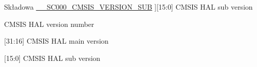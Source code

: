 \begin{DoxyRefList}
%
Składowa \hyperlink{core__sc000_8h_af4db9bbe5ff5726d8a8c388e52d5685d}{\+\_\+\+\_\+\+S\+C000\+\_\+\+C\+M\+S\+I\+S\+\_\+\+V\+E\+R\+S\+I\+O\+N\+\_\+\+S\+UB} ]\mbox{[}15\+:0\mbox{]} C\+M\+S\+IS H\+AL sub version  
\item[\label{deprecated__deprecated000036}%
\Hypertarget{deprecated__deprecated000036}%
Składowa \hyperlink{core__sc300_8h_a2f960c3c99ab33e1cf4b5287821c44dd}{\+\_\+\+\_\+\+S\+C300\+\_\+\+C\+M\+S\+I\+S\+\_\+\+V\+E\+R\+S\+I\+ON} ]C\+M\+S\+IS H\+AL version number  
\item[\label{deprecated__deprecated000034}%
\Hypertarget{deprecated__deprecated000034}%
Składowa \hyperlink{core__sc300_8h_a0e2124db4f74f2b355904314accf1790}{\+\_\+\+\_\+\+S\+C300\+\_\+\+C\+M\+S\+I\+S\+\_\+\+V\+E\+R\+S\+I\+O\+N\+\_\+\+M\+A\+IN} ]\mbox{[}31\+:16\mbox{]} C\+M\+S\+IS H\+AL main version  
\item[\label{deprecated__deprecated000035}%
\Hypertarget{deprecated__deprecated000035}%
Składowa \hyperlink{core__sc300_8h_a664c9e59952455ddeee28173b864fe9d}{\+\_\+\+\_\+\+S\+C300\+\_\+\+C\+M\+S\+I\+S\+\_\+\+V\+E\+R\+S\+I\+O\+N\+\_\+\+S\+UB} ]\mbox{[}15\+:0\mbox{]} C\+M\+S\+IS H\+AL sub version 
\end{DoxyRefList}
